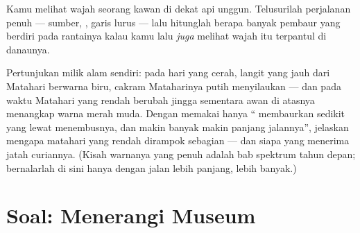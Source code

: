 \begin{exercise}[$\star\star$]\label{exo:g7:light-sources-propagation:11}
Kamu melihat wajah seorang kawan di dekat api unggun. Telusurilah
perjalanan penuh  --- sumber, , garis lurus --- lalu
hitunglah berapa banyak pembaur yang berdiri pada rantainya kalau kamu
lalu \emph{juga} melihat wajah itu terpantul di danaunya.
\end{exercise}

\begin{exercise}[$\star\star\star$]\label{exo:g7:light-sources-propagation:12}
Pertunjukan  milik alam sendiri: pada hari yang cerah, langit
yang jauh dari Matahari berwarna biru, cakram Mataharinya putih
menyilaukan --- dan pada waktu  Matahari yang rendah
berubah jingga sementara awan di atasnya menangkap warna merah muda.
Dengan memakai hanya `` membaurkan sedikit  yang lewat
menembusnya, dan makin banyak makin panjang jalannya'', jelaskan
mengapa matahari yang rendah dirampok sebagian  --- dan siapa
yang menerima jatah curiannya. (Kisah warnanya yang penuh adalah bab
spektrum tahun depan; bernalarlah di sini hanya dengan jalan lebih
panjang,  lebih banyak.)
\end{exercise}

\section{Soal: Menerangi Museum}

